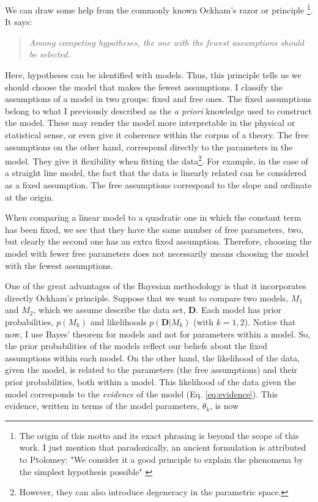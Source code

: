 We can draw some help from the commonly known Ockham's razor or principle \footnote{The origin of this motto and its exact phrasing is beyond the scope of this work. I just mention that paradoxically, an ancient formulation is attributed to Ptolomey: "We consider it a good principle to explain the phenomena by the simplest hypothesis possible" \citep{Franklin2002}}. It says:
\begin{quotation}
\textit{Among competing hypotheses, the one with the fewest assumptions should be selected.}
\end{quotation}

Here, hypotheses can be identified with models. Thus, this principle tells us we should choose the model that makes the fewest assumptions. I classify the assumptions of a model in two groups: fixed and free ones. The fixed assumptions belong to what I previously described as the \emph{a priori} knowledge used to construct the model. These may render the model more interpretable in the physical or statistical sense, or even give it coherence within the corpus of a theory. The free assumptions on the other hand, correspond directly to the parameters in the model. They give it flexibility when fitting the data\footnote{However, they can also introduce degeneracy in the parametric space.}. For example, in the case of a straight line model, the fact that the data is linearly related can be considered as a fixed assumption. The free assumptions correspond to the slope and ordinate at the origin. 

When comparing a linear model to a quadratic one in which the constant term has been fixed, we see that they have the same number of free parameters, two, but clearly the second one has an extra fixed assumption. Therefore, choosing the model with fewer free parameters does not necessarily means choosing the model with the fewest assumptions.

One of the great advantages of the Bayesian methodology is that it incorporates directly Ockham's principle. Suppose that we want to compare two models, $M_1$ and $M_2$, which we assume describe the data set, $\mathbf{D}$. Each model has prior probabilities, $p(M_k)$ and likelihoods $p(\mathbf{D}|M_k)$ (with $k=1,2$). Notice that now, I use Bayes' theorem for models and not for parameters within a model. So, the prior probabilities of the models reflect our beliefs about the fixed assumptions within each model. On the other hand, the likelihood of the data, given the model, is related to the parameters (the free assumptions) and their prior probabilities, both within a model. This likelihood of the data given the model corresponds to the \emph{evidence} of the model (Eq. \ref{eq:evidence}). This evidence, written in terms of the model parameters, $\theta_k$, is now

